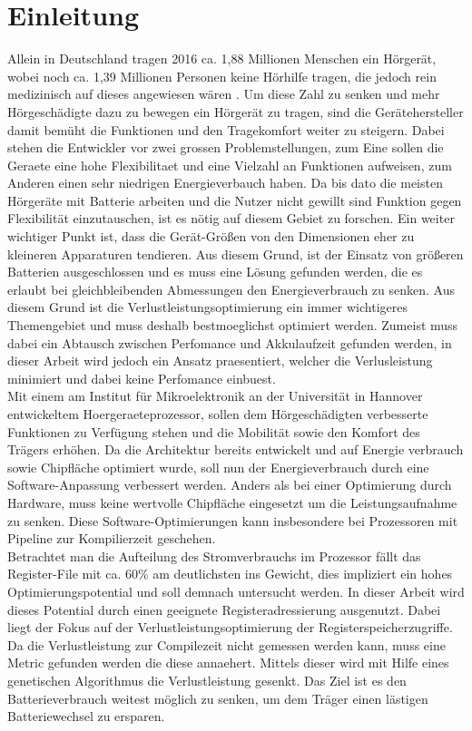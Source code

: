 
\thispagestyle{empty}
%
\chapter{Einleitung}
\label{chap:introduction}
Allein in Deutschland tragen 2016 ca. 1,88 Millionen Menschen ein Hörgerät, wobei noch ca. 1,39 Millionen Personen keine Hörhilfe tragen, die jedoch rein medizinisch auf dieses angewiesen wären \cite{statistica}. Um diese Zahl zu senken und mehr Hörgeschädigte dazu zu bewegen ein Hörgerät zu tragen, sind die Gerätehersteller damit bemüht die Funktionen und den Tragekomfort weiter zu steigern.
Dabei stehen die Entwickler vor zwei grossen Problemstellungen, zum Eine sollen die Geraete eine hohe Flexibilitaet und eine Vielzahl an Funktionen aufweisen, zum Anderen einen sehr niedrigen Energieverbauch haben.
Da bis dato die meisten Hörgeräte mit Batterie arbeiten und die Nutzer nicht gewillt sind Funktion gegen Flexibilität einzutauschen, ist es nötig auf diesem Gebiet zu forschen. Ein weiter wichtiger Punkt ist, dass die Gerät-Größen von den Dimensionen eher zu kleineren Apparaturen tendieren. Aus diesem Grund, ist der Einsatz von größeren Batterien ausgeschlossen und es muss eine Lösung gefunden werden, die es erlaubt bei gleichbleibenden Abmessungen den Energieverbrauch zu senken. Aus diesem Grund ist die Verlustleistungsoptimierung ein immer wichtigeres Themengebiet und muss deshalb bestmoeglichst optimiert werden. 
Zumeist muss dabei ein Abtausch zwischen Perfomance und Akkulaufzeit gefunden werden, in dieser Arbeit wird jedoch ein Ansatz praesentiert, welcher die Verlusleistung minimiert und dabei keine Perfomance einbuest.\\
Mit einem am Institut für Mikroelektronik an der Universität in Hannover entwickeltem Hoergeraeteprozessor, sollen dem Hörgeschädigten verbesserte Funktionen zu Verfügung stehen und die Mobilität sowie den Komfort des Trägers erhöhen. Da die Architektur bereits entwickelt und auf Energie verbrauch sowie Chipfläche optimiert wurde, soll nun der Energieverbrauch durch eine Software-Anpassung verbessert werden. Anders als bei einer Optimierung durch Hardware, muss keine wertvolle Chipfläche eingesetzt um die Leistungsaufnahme zu senken. Diese Software-Optimierungen kann insbesondere bei Prozessoren mit Pipeline zur Kompilierzeit geschehen.\\
Betrachtet man die Aufteilung des Stromverbrauchs im Prozessor fällt das Register-File mit ca. 60\% am deutlichsten ins Gewicht, dies impliziert ein hohes Optimierungspotential und soll demnach untersucht werden. In dieser Arbeit wird dieses Potential durch einen geeignete Registeradressierung ausgenutzt. Dabei liegt der Fokus auf der Verlustleistungsoptimierung der Registerspeicherzugriffe. Da die Verlustleistung zur Compilezeit nicht gemessen werden kann, muss eine Metric gefunden werden die diese annaehert. Mittels dieser wird mit Hilfe eines genetischen Algorithmus die Verlustleistung gesenkt. Das Ziel ist es den Batterieverbrauch weitest möglich zu senken, um dem Träger einen lästigen Batteriewechsel zu ersparen.


